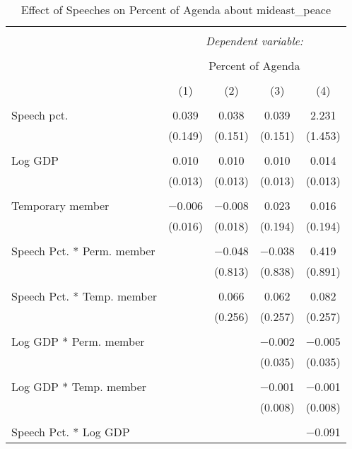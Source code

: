 
\begin{table}[!htbp] \centering 
  \caption{Effect of Speeches on Percent of Agenda about  mideast_peace} 
  \label{} 
\begin{tabular}{@{\extracolsep{5pt}}lcccc} 
\\[-1.8ex]\hline 
\hline \\[-1.8ex] 
 & \multicolumn{4}{c}{\textit{Dependent variable:}} \\ 
\cline{2-5} 
\\[-1.8ex] & \multicolumn{4}{c}{Percent of Agenda} \\ 
\\[-1.8ex] & (1) & (2) & (3) & (4)\\ 
\hline \\[-1.8ex] 
 Speech pct. & 0.039 & 0.038 & 0.039 & 2.231 \\ 
  & (0.149) & (0.151) & (0.151) & (1.453) \\ 
  & & & & \\ 
 Log GDP & 0.010 & 0.010 & 0.010 & 0.014 \\ 
  & (0.013) & (0.013) & (0.013) & (0.013) \\ 
  & & & & \\ 
 Temporary member & $-$0.006 & $-$0.008 & 0.023 & 0.016 \\ 
  & (0.016) & (0.018) & (0.194) & (0.194) \\ 
  & & & & \\ 
 Speech Pct. * Perm. member &  & $-$0.048 & $-$0.038 & 0.419 \\ 
  &  & (0.813) & (0.838) & (0.891) \\ 
  & & & & \\ 
 Speech Pct. * Temp. member &  & 0.066 & 0.062 & 0.082 \\ 
  &  & (0.256) & (0.257) & (0.257) \\ 
  & & & & \\ 
 Log GDP * Perm. member &  &  & $-$0.002 & $-$0.005 \\ 
  &  &  & (0.035) & (0.035) \\ 
  & & & & \\ 
 Log GDP * Temp. member &  &  & $-$0.001 & $-$0.001 \\ 
  &  &  & (0.008) & (0.008) \\ 
  & & & & \\ 
 Speech Pct. * Log GDP &  &  &  & $-$0.091 \\ 

\end{tabular}
\end{table}
